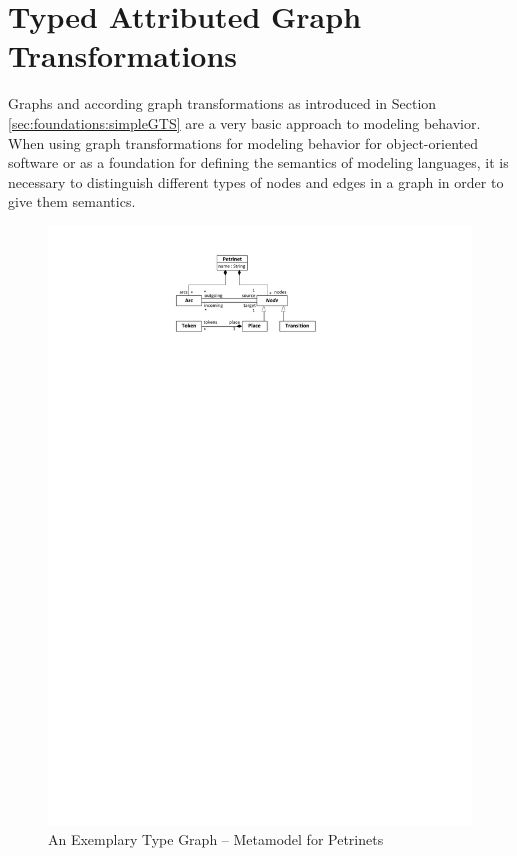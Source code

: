 \section{Typed Attributed Graph Transformations}
\label{sec:foundations:typedAttrGTS}

Graphs and according graph transformations as introduced in Section \ref{sec:foundations:simpleGTS} are a very basic approach to modeling behavior.
When using graph transformations for modeling behavior for object-oriented software or as a foundation for defining the semantics of modeling languages,
it is necessary to distinguish different types of nodes and edges in a graph in order to give them semantics.

\begin{figure}[htb]
  \centering
  \includegraphics[scale=1]{figures/Petrinet}
  \caption{An Exemplary Type Graph -- Metamodel for Petrinets}
  \label{fig:PetrinetTypeGraph}
\end{figure}

